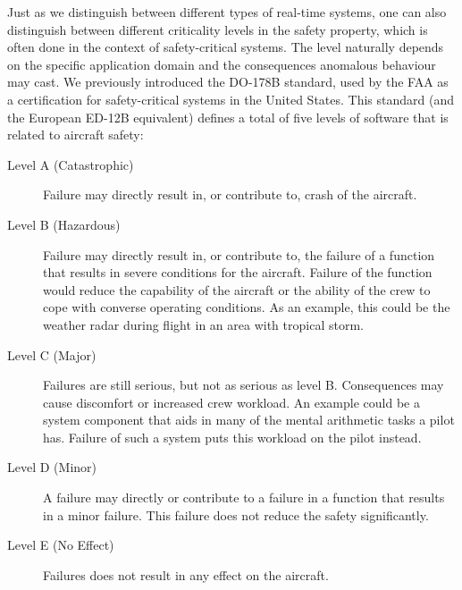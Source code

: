 Just as we distinguish between different types of real-time systems, one can also distinguish between different criticality levels in the safety property, which is often done in the context of safety-critical systems. The level naturally depends on the specific application domain and the consequences anomalous behaviour may cast. We previously introduced the DO-178B standard, used by the FAA as a certification for safety-critical systems in the United States. This standard (and the European ED-12B equivalent) defines a total of five levels of software that is related to aircraft safety:
\begin{description}
	\item[Level A (Catastrophic)] Failure may directly result in, or contribute to, crash of the aircraft.  
	\item[Level B (Hazardous)] Failure may directly result in, or contribute to, the failure of a function that results in severe conditions for the aircraft. Failure of the function would reduce the capability of the aircraft or the ability of the crew to cope with converse operating conditions. As an example, this could be the weather radar during flight in an area with tropical storm.
	\item[Level C (Major)] Failures are still serious, but not as serious as level B. Consequences may cause discomfort or increased crew workload. An example could be a system component that aids in many of the mental arithmetic tasks a pilot has. Failure of such a system puts this workload on the pilot instead.
	\item[Level D (Minor)] A failure may directly or contribute to a failure in a function that results in a minor failure. This failure does not reduce the safety significantly.
	\item[Level E (No Effect)] Failures does not result in any effect on the aircraft.
\end{description}

